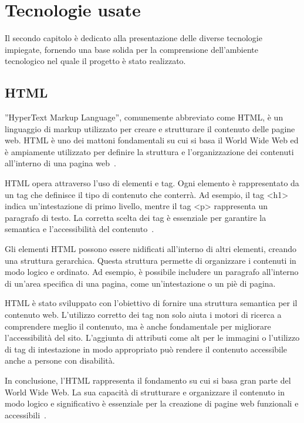 \clearpage{\pagestyle{empty}\cleardoublepage}
\chapter{Tecnologie usate} 
Il secondo capitolo è dedicato alla presentazione delle diverse tecnologie impiegate, fornendo una base solida per la comprensione dell'ambiente tecnologico nel quale il progetto è stato realizzato.

\section{HTML}
”HyperText Markup Language”, comunemente abbreviato come HTML, è un linguaggio di markup utilizzato per creare e strutturare il contenuto delle pagine web. HTML è uno dei mattoni fondamentali su cui si basa il World Wide Web ed è ampiamente utilizzato per definire la struttura e l'organizzazione dei contenuti all'interno di una pagina web~\cite{Semantic_web, Core_web}.

HTML opera attraverso l'uso di elementi e tag. Ogni elemento è rappresentato da un tag che definisce il tipo di contenuto che conterrà. Ad esempio, il tag <h1> indica un'intestazione di primo livello, mentre il tag <p> rappresenta un paragrafo di testo. La corretta scelta dei tag è essenziale per garantire la semantica e l'accessibilità del contenuto~\cite{Core_web}.

Gli elementi HTML possono essere nidificati all'interno di altri elementi, creando una struttura gerarchica. Questa struttura permette di organizzare i contenuti in modo logico e ordinato. Ad esempio, è possibile includere un paragrafo all'interno di un'area specifica di una pagina, come un'intestazione o un piè di pagina.

HTML è stato sviluppato con l'obiettivo di fornire una struttura semantica per il contenuto web. L'utilizzo corretto dei tag non solo aiuta i motori di ricerca a comprendere meglio il contenuto, ma è anche fondamentale per migliorare l'accessibilità del sito. L'aggiunta di attributi come alt per le immagini o l'utilizzo di tag di intestazione in modo appropriato può rendere il contenuto accessibile anche a persone con disabilità.

In conclusione, l'HTML rappresenta il fondamento su cui si basa gran parte del World Wide Web. La sua capacità di strutturare e organizzare il contenuto in modo logico e significativo è essenziale per la creazione di pagine web funzionali e accessibili~\cite{Semantic_web}.


